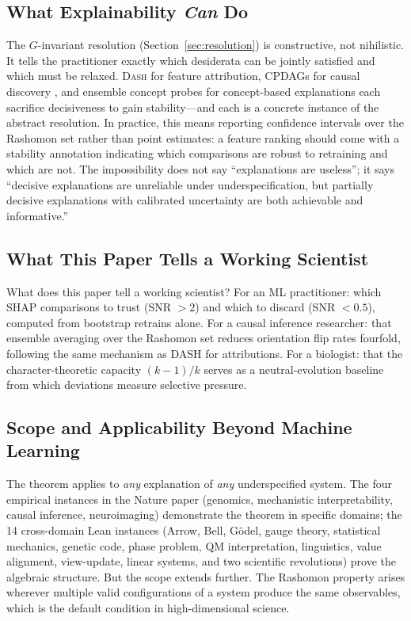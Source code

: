 \documentclass[11pt,a4paper]{article}
\newcommand{\DASH}{\textsc{Dash}}
\begin{document}
\subsection[What Explainability Can Do]{What Explainability \emph{Can} Do}
\label{sec:can-do}

The $G$-invariant resolution (Section~\ref{sec:resolution}) is constructive, not
nihilistic.  It tells the practitioner exactly which desiderata can be jointly
satisfied and which must be relaxed.  \DASH{} for feature attribution, CPDAGs
for causal discovery \citep{verma1991equivalence}, and ensemble concept probes
for concept-based explanations \citep{kim2018tcav} each sacrifice decisiveness
to gain stability---and each is a concrete instance of the abstract resolution.
In practice, this means reporting confidence intervals over the Rashomon set
\citep{fisher2019models,semenova2022existence} rather than point estimates:
a feature ranking should come with a stability annotation indicating which
comparisons are robust to retraining and which are not.  The impossibility does
not say ``explanations are useless''; it says ``decisive explanations are
unreliable under underspecification, but partially decisive explanations with
calibrated uncertainty are both achievable and informative.''

\subsection{What This Paper Tells a Working Scientist}
\label{sec:working-scientist}

What does this paper tell a working scientist?  For an ML practitioner: which SHAP comparisons to trust (SNR $> 2$) and which to discard (SNR $< 0.5$), computed from bootstrap retrains alone.  For a causal inference researcher: that ensemble averaging over the Rashomon set reduces orientation flip rates fourfold, following the same mechanism as DASH for attributions.  For a biologist: that the character-theoretic capacity $(k{-}1)/k$ serves as a neutral-evolution baseline from which deviations measure selective pressure.

\subsection{Scope and Applicability Beyond Machine Learning}
\label{sec:scope}

The theorem applies to \emph{any} explanation of \emph{any} underspecified system.  The four empirical instances in the Nature paper (genomics, mechanistic interpretability, causal inference, neuroimaging) demonstrate the theorem in specific domains; the 14 cross-domain Lean instances (Arrow, Bell, G\"odel, gauge theory, statistical mechanics, genetic code, phase problem, QM interpretation, linguistics, value alignment, view-update, linear systems, and two scientific revolutions) prove the algebraic structure.  But the scope extends further.  The Rashomon property arises wherever multiple valid configurations of a system produce the same observables, which is the default condition in high-dimensional science.
\end{document}
